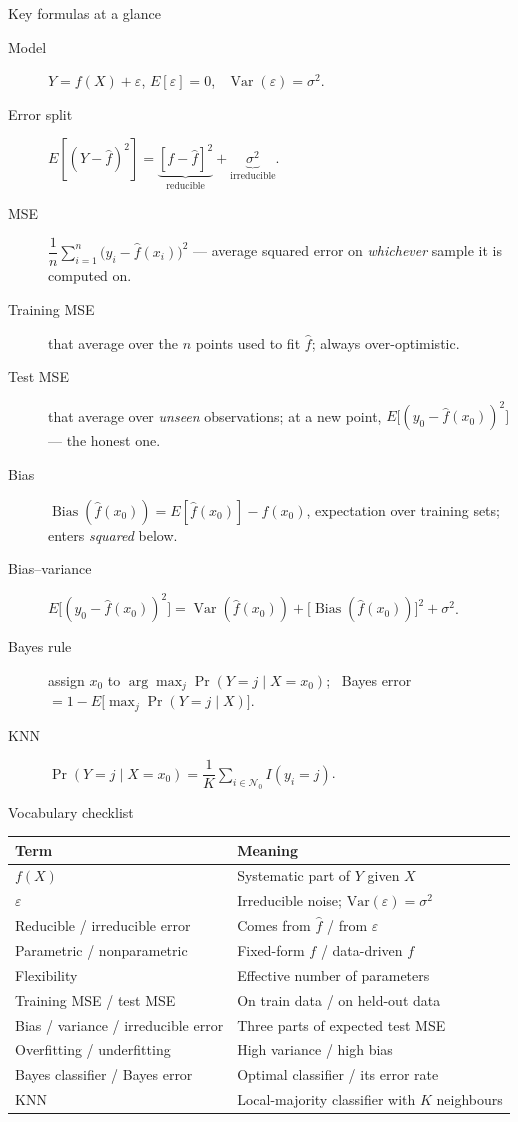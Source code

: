 \documentclass[aspectratio=169,11pt]{beamer}
\begin{document}
\begin{frame}{Key formulas at a glance}
  \footnotesize
  \begin{description}
    \item[Model] $Y=f(X)+\varepsilon$, \quad $E[\varepsilon]=0$, \ $\operatorname{Var}(\varepsilon)=\sigma^2$.
    \item[Error split] $E[(Y-\hat f)^2]=\underbrace{[f-\hat f]^2}_{\text{reducible}}+\underbrace{\sigma^2}_{\text{irreducible}}$.
    \item[MSE] $\dfrac1n\sum_{i=1}^n\big(y_i-\hat f(x_i)\big)^2$ --- average squared error on \emph{whichever} sample it is computed on.
    \item[Training MSE] that average over the $n$ points used to fit $\hat f$; always over-optimistic.
    \item[Test MSE] that average over \emph{unseen} observations; at a new point, $E\big[(y_0-\hat f(x_0))^2\big]$ --- the honest one.
    \item[Bias] $\operatorname{Bias}(\hat f(x_0))=E[\hat f(x_0)]-f(x_0)$, expectation over training sets; enters \emph{squared} below.
    \item[Bias--variance] $E\big[(y_0-\hat f(x_0))^2\big]=\operatorname{Var}(\hat f(x_0))+\big[\operatorname{Bias}(\hat f(x_0))\big]^2+\sigma^2$.
    \item[Bayes rule] assign $x_0$ to $\arg\max_j \Pr(Y=j\mid X=x_0)$; \ Bayes error $=1-E\big[\max_j \Pr(Y=j\mid X)\big]$.
    \item[KNN] $\Pr(Y=j\mid X=x_0)=\dfrac1K\sum_{i\in\mathcal N_0} I(y_i=j)$.
  \end{description}
\end{frame}

\begin{frame}{Vocabulary checklist}
  \footnotesize
  \begin{tabular}{ll}
    \toprule
    \textbf{Term} & \textbf{Meaning} \\
    \midrule
    $f(X)$ & Systematic part of $Y$ given $X$ \\
    $\varepsilon$ & Irreducible noise; $\mathrm{Var}(\varepsilon) = \sigma^2$ \\
    Reducible / irreducible error & Comes from $\hat f$ / from $\varepsilon$ \\
    Parametric / nonparametric & Fixed-form $f$ / data-driven $f$ \\
    Flexibility & Effective number of parameters \\
    Training MSE / test MSE & On train data / on held-out data \\
    Bias / variance / irreducible error & Three parts of expected test MSE \\
    Overfitting / underfitting & High variance / high bias \\
    Bayes classifier / Bayes error & Optimal classifier / its error rate \\
    KNN & Local-majority classifier with $K$ neighbours \\
    \bottomrule
  \end{tabular}
\end{frame}
\end{document}
